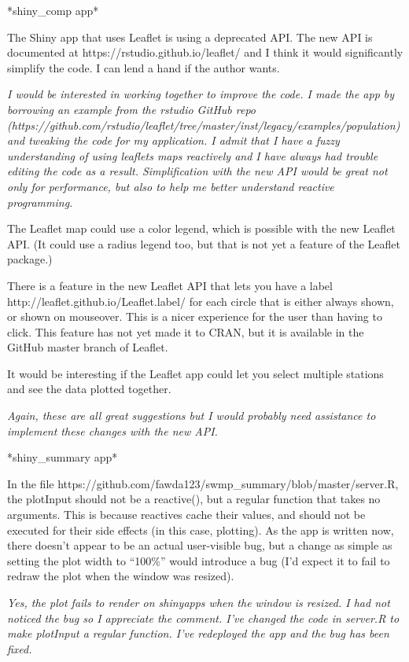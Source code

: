 \documentclass[letterpaper,12pt]{article}\usepackage[]{graphicx}\usepackage[]{color}
\begin{document}
*shiny\_comp app*

The Shiny app that uses Leaflet is using a deprecated API. The new API is documented at https://rstudio.github.io/leaflet/ and I think it would significantly simplify the code. I can lend a hand if the author wants.

{\it I would be interested in working together to improve the code.  I made the app by borrowing an example from the rstudio GitHub repo (https://github.com/rstudio/leaflet/tree/master/inst/legacy/examples/population) and tweaking the code for my application.  I admit that I have a fuzzy understanding of using leaflets maps reactively and I have always had trouble editing the code as a result.  Simplification with the new API would be great not only for performance, but also to help me better understand reactive programming.}

The Leaflet map could use a color legend, which is possible with the new Leaflet API. (It could use a radius legend too, but that is not yet a feature of the Leaflet package.)

There is a feature in the new Leaflet API that lets you have a label http://leaflet.github.io/Leaflet.label/ for each circle that is either always shown, or shown on mouseover. This is a nicer experience for the user than having to click. This feature has not yet made it to CRAN, but it is available in the GitHub master branch of Leaflet.

It would be interesting if the Leaflet app could let you select multiple stations and see the data plotted together.

{\it Again, these are all great suggestions but I would probably need assistance to implement these changes with the new API.}

*shiny\_summary app*

In the file https://github.com/fawda123/swmp\_summary/blob/master/server.R, the plotInput should not be a reactive(), but a regular function that takes no arguments. This is because reactives cache their values, and should not be executed for their side effects (in this case, plotting). As the app is written now, there doesn't appear to be an actual user-visible bug, but a change as simple as setting the plot width to ``100\%'' would introduce a bug (I'd expect it to fail to redraw the plot when the window was resized).

{\it Yes, the plot fails to render on shinyapps when the window is resized.  I had not noticed the bug so I appreciate the comment.  I've changed the code in server.R to make plotInput a regular function.  I've redeployed the app and the bug has been fixed.}
\end{document}
